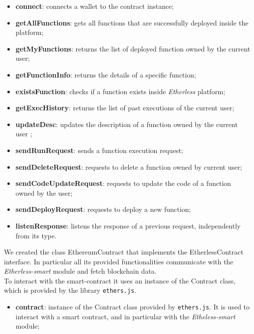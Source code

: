 					\begin{itemize}
						\item \textbf{connect}: connects a wallet to the contract instance;
						\item \textbf{getAllFunctions}: gets all functions that are successfully deployed inside the platform;
						\item \textbf{getMyFunctions}: returns the list of deployed function owned by the current user;
						\item \textbf{getFunctionInfo}: returns the details of a specific function;
						\item \textbf{existsFunction}: checks if a function exists inside \textit{Etherless} platform;
						\item \textbf{getExecHistory}: returns the list of past executions of the current user;
						\item \textbf{updateDesc}: updates the description of a function owned by the current user ;
						\item \textbf{sendRunRequest}: sends a function execution request;
						\item \textbf{sendDeleteRequest}: requests to delete a function owned by current user; 
						\item \textbf{sendCodeUpdateRequest}: requests to update the code of a function owned by the user; 
						\item \textbf{sendDeployRequest}: requests to deploy a new function; 
						\item \textbf{listenResponse}: listens the response of a previous request, independently from its type.
					\end{itemize}
		
			We created the class EthereumContract that implements the EtherlessContract interface. In particular all its provided functionalities communicate with the \textit{Etherless-smart} module and fetch blockchain data. \\ To interact with the smart-contract it uses an instance of the Contract class, which is provided by the library \texttt{ethers.js}.
					\begin{itemize}
						\item \textbf{contract}: instance of the Contract class provided by \texttt{ethers.js}. It is used to interact with a smart contract, and in particular with the \textit{Etheless-smart} module; 
					\end{itemize}
				
